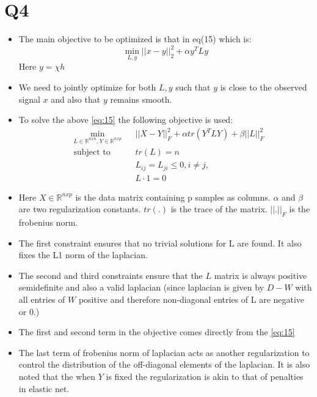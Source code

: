 \documentclass{article}
\begin{document}
\section*{Q4}
\begin{itemize}
\item The main objective to be optimized is that in eq(15) which is:
  \begin{equation}
    \label{eq:15}
    \min_{L, y} ||x - y||_2^2 + \alpha y^T L y
  \end{equation}
  Here $y = \chi h$
\item We need to jointly optimize for both $L, y$ such that $y$ is close to the observed signal $x$ and also that $y$ remains smooth.
\item To solve the above \ref{eq:15} the following objective is used:
  \begin{equation}
    \label{eq:16}
    \begin{aligned}
      & \min_{L \in \mathbb{R}^{n x n}, Y \in \mathbb{R}^{n x p}}
      & & ||X - Y||_F^2 + \alpha tr(Y^T L Y) + \beta||L||_F^2 \\
    & \text{subject to}
    & & tr(L) = n \\
    &&& L_{ij} = L_{ji} \le 0, i \ne j, \\
    &&& L \cdot 1 = 0
    \end{aligned}
  \end{equation}
\item Here $X \in \mathbb{R}^{n x p}$ is the data matrix containing p samples as columns. $\alpha$ and $\beta$ are two regularization constants. $tr(.)$ is the trace of the matrix. $||.||_F$ is the frobenius norm.
\item The first constraint ensures that no trivial solutions for L are found. It also fixes the L1 norm of the laplacian.
\item The second and third constraints ensure that the $L$ matrix is always positive semidefinite and also a valid laplacian (since laplacian is given by $D-W$ with all entries of $W$ positive and therefore non-diagonal entries of L are negative or 0.)
\item The first and second term in the objective comes directly from the \ref{eq:15}
\item The last term of frobenius norm of laplacian acts as another regularization to control the distribution of the off-diagonal elements of the laplacian. It is also noted that the when $Y$ is fixed the regularization is akin to that of penalties in elastic net.
\end{itemize}
\end{document}
